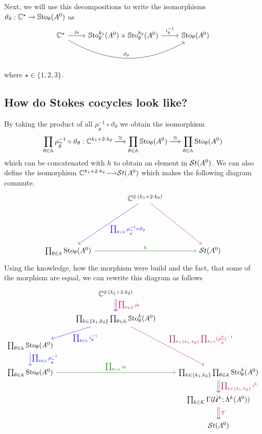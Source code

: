 Next, we will use this decompositions to write the isomorphisms
$\vartheta_\theta:\mathbb{C}^\star\to \operatorname{\mathbb{S}to}_\theta(A^0)$ as
\[ \begin{tikzcd}
  \C^\star
  \rar{j_\theta}
  \arrow[rr,out=-30,in=-150,"\vartheta_\theta"]
  &
  \SSto_\theta^{k_1}(A^0)\times\SSto_\theta^{k_2}(A^0)
  \rar{i_\theta^{-1}}
  &
  \SSto_\theta(A^0)
\end{tikzcd} \]
where $\star\in\{1,2,3\}$.

\subsection{How do Stokes cocycles look like?}
\begin{prop}
  By taking the product of all $\rho_{\tilde\theta}^{-1}\circ\vartheta_\theta$
  we obtain the isomorphism
  \[
    \prod_{\theta\in\mathbb{A}}\rho_{\widetilde\theta}^{-1}\circ\vartheta_\theta:
    \mathbb{C}^{k_1+2\cdot k_2}
    \overset\cong\longrightarrow
    \prod_{\theta\in\mathbb{A}}\operatorname{\mathbb{S}to}_\theta(A^0)
    \overset\cong\longrightarrow
    \prod_{\theta\in\mathbb{A}}\operatorname{Sto}_\theta(A^0)
  \]
  which can be concatenated with $h$ to obtain an element in $\mathcal{S}{}t(A^0)$.
  We can also define the isomorphism
  $\mathbb{C}^{k_1+2\cdot k_2} \textcolor{purple}{\longrightarrow} \mathcal{S}{}t(A^0)$
  which makes the following diagram commute.
  \[ \begin{tikzcd}[column sep=1.5cm,row sep=2cm]
      &\C^{2\cdot(k_1+2\cdot k_2)} 
      \dlar[blue]{\prod_{\theta\in\A}\rho_{\tilde\theta}^{-1}\circ\vartheta_\theta}
      \arrow[dr,purple]
    \\\prod_{\theta\in\A}\Sto_\theta(A^0)
      \arrow[rr,green!50!black,"h"]
      &&\St(A^0)
  \end{tikzcd} \]
  Using the knowledge, how the morphism were build and the fact, that some of
  the morphism are equal, we can rewrite this diagram as follows
  \[ \begin{tikzcd}
      &\C^{2\cdot(k_1+2\cdot k_2)}
      \dar[xshift=-1pt,blue]
      \dar[xshift=1pt,purple,"\prod_{\theta\in\A}j_\theta"]
    \\
      &\prod_{k\in\{k_1,k_2\}}\prod_{\theta\in\A}\SSto_{\theta}^{k}(A^0)
       \arrow[dl,blue,"\prod_{\theta\in\A}i_\theta^{-1}"]
       \arrow[ddr,purple,
         "\prod_{k\in\{k_1,k_2\}}\prod_{\theta\in\A}(\rho_{\tilde\theta}^k)^{-1}"]
    \\ \prod_{\theta\in\A} \SSto_{\theta}(A^0)
        \dar[blue]{\prod_{\theta\in\A}\rho_{\tilde\theta}^{-1}}
    \\\prod_{\theta\in\A} \Sto_{\theta}(A^0)
      \arrow[rr,green!50!black,"\prod_{\theta\in\A}i_\theta"]
      &&\prod_{k\in\{k_1,k_2\}}\prod_{\theta\in\A}\Sto_{\theta}^{k}(A^0)
      \dar[xshift=-1pt,green!50!black]
      \dar[xshift=1pt,purple]{\prod_{k\in\{k_1,k_2\}}i^k}
    \\
      && \prod_{k\in\cK}\Gamma(\dot\cU^k;\Lambda^k(A^0))
      \dar[xshift=-1pt,green!50!black]
      \dar[xshift=1pt,purple]{\cT}
    \\&& \St(A^0)
  \end{tikzcd} \]
\end{prop}

